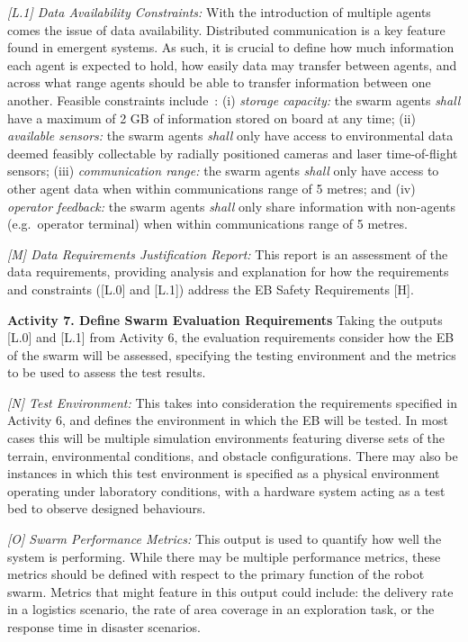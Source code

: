\documentclass{article}
\begin{document}
\emph{[L.1] Data Availability Constraints:}
With the introduction of multiple agents comes the issue of data availability. Distributed communication is a key feature found in emergent systems. As such, it is crucial to define how much information each agent is expected to hold, how easily data may transfer between agents, and across what range agents should be able to transfer information between one another. Feasible constraints include~\cite{Jones2022}: (i) \emph{storage capacity: }the swarm agents \emph{shall} have a maximum of 2 GB of information stored on board at any time; (ii) \emph{available sensors:} the swarm agents \emph{shall} only have access to environmental data deemed feasibly collectable by radially positioned cameras and laser time-of-flight sensors; (iii) \emph{communication range:} the swarm agents \emph{shall} only have access to other agent data when within communications range of 5 metres; and (iv) \emph{operator feedback:} the swarm agents \emph{shall} only share information with non-agents (e.g.\ operator terminal) when within communications range of 5 metres.

\emph{[M] Data Requirements Justification Report:}
This report is an assessment of the data requirements, providing analysis and explanation for how the requirements and constraints ([L.0] and [L.1]) address the EB Safety Requirements [H].

\noindent\textbf{Activity 7. Define Swarm Evaluation Requirements} Taking the outputs [L.0] and [L.1] from Activity 6, the evaluation requirements consider how the EB of the swarm will be assessed, specifying the testing environment and the metrics to be used to assess the test results. 

\emph{[N] Test Environment:} This takes into consideration the requirements specified in Activity 6, and defines the environment in which the EB will be tested. In most cases this will be multiple simulation environments featuring diverse sets of the terrain, environmental conditions, and obstacle configurations. There may also be instances in which this test environment is specified as a physical environment operating under laboratory conditions, with a hardware system acting as a test bed to observe designed behaviours.

\emph{[O] Swarm Performance Metrics:} This output is used to quantify how well the system is performing. While there may be multiple performance metrics, these metrics should be defined with respect to the primary function of the robot swarm. Metrics that might feature in this output could include: the delivery rate in a logistics scenario, the rate of area coverage in an exploration task, or the response time in disaster scenarios.
\end{document}
